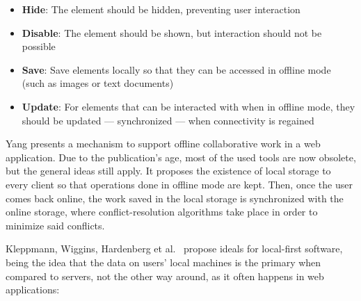 \begin{itemize}
    \item \textbf{Hide}: The element should be hidden, preventing user interaction
    \item \textbf{Disable}: The element should be shown, but interaction should not be possible
    \item \textbf{Save}: Save elements locally so that they can be accessed in offline mode (such as images or text documents)
    \item \textbf{Update}: For elements that can be interacted with when in offline mode, they should be updated --- synchronized --- when connectivity is regained
\end{itemize}

Yang \cite{Yang2000} presents a mechanism to support offline collaborative work in a web application. Due to the publication's age, most of the used tools are now obsolete, but the general ideas still apply. It proposes the existence of local storage to every client so that operations done in offline mode are kept. Then, once the user comes back online, the work saved in the local storage is synchronized with the online storage, where conflict-resolution algorithms take place in order to minimize said conflicts.

Kleppmann, Wiggins, Hardenberg et al.\ \cite{Kleppmann2019} propose ideals for local-first software, being the idea that the data on users' local machines is the primary when compared to servers, not the other way around, as it often happens in web applications:

